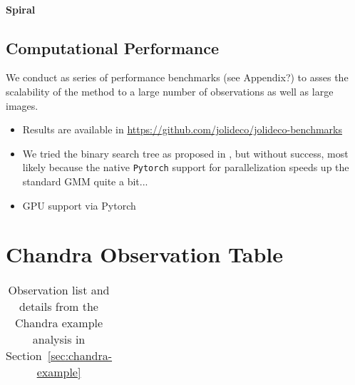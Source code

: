 \documentclass[twocolumn]{aastex631}
\begin{document}
    \paragraph{Spiral}

    \subsection{Computational Performance}
    We conduct as series of performance benchmarks (see Appendix?) to asses the scalability of the method to a large number of observations as well as large images. 

    \begin{itemize}
        \item Results are available in \url{https://github.com/jolideco/jolideco-benchmarks}
        \item We tried the binary search tree as proposed in \cite{Parameswaran2018},
        but without success, most likely because the native \texttt{Pytorch} support
        for parallelization speeds up the standard GMM quite a bit...
        \item GPU support via Pytorch
    \end{itemize}


    \section{Chandra Observation Table}
    
    \begin{table}
    \centering
        \begin{tabular}{ c|c|c|c|c } 
            
        \end{tabular}
        \label{tab:chandra_obs}
        \caption{Observation list and details from the Chandra example analysis in Section~\ref{sec:chandra-example}}
    \end{table}
    
\end{document}
